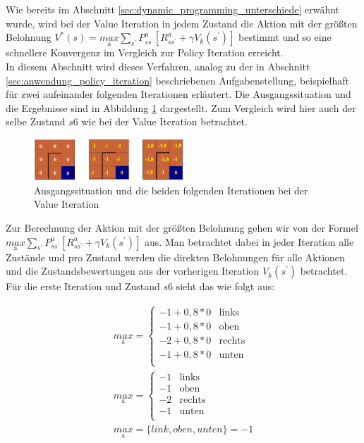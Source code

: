 \documentclass[10pt]{scrartcl}
\begin{document}
Wie bereits im Abschnitt \ref{sec:dynamic_programming_unterschiede} erwähnt wurde, wird bei der Value Iteration in jedem Zustand die Aktion mit der größten Belohnung $V^{*}(s) = \underset{\text{a}}{max} \sum_{s^{'}} P^a_{ss^{'}} [R^a_{ss^{'}} + \gamma V_{k} (s^{'})]$ bestimmt und so eine schnellere Konvergenz im Vergleich zur Policy Iteration erreicht.\\
In diesem Abschnitt wird dieses Verfahren, analog zu der in Abschnitt \ref{sec:anwendung_policy_iteration} beschriebenen Aufgabenstellung, beispielhaft für zwei aufeinander folgenden Iterationen erläutert.
Die Ausgangssituation und die Ergebnisse sind in Abbildung \ref{fig:value_aufgabe} dargestellt.
Zum Vergleich wird hier auch der selbe Zustand $s6$ wie bei der Value Iteration betrachtet.\\ 

\begin{figure}[htbp]
	\centering	\includegraphics[width=0.5\textwidth]{Bilder/ValueIterationAufgabe}
	\caption{Ausgangssituation und die beiden folgenden Iterationen bei der Value Iteration}
	\label{fig:value_aufgabe}
\end{figure}

Zur Berechnung der Aktion mit der größten Belohnung gehen wir von der Formel $\underset{\text{a}}{max} \sum_{s^{'}} P^a_{ss^{'}} [R^a_{ss^{'}} + \gamma V_{k} (s^{'})]$ aus.
Man betrachtet dabei in jeder Iteration alle Zustände und pro Zustand werden die direkten Belohnungen für alle Aktionen und die Zustandsbewertungen aus der vorherigen Iteration $V_{k}(s^{'})$ betrachtet.
Für die erste Iteration und Zustand $s6$ sieht das wie folgt aus:

\begin{align}
	\underset{\text{a}}{max} = \begin{cases} 
		-1 + 0,8 * 0 & \text{links} \\ 
		-1 + 0,8 * 0 & \text{oben} \\
		-2 + 0,8 * 0 & \text{rechts} \\
		-1 + 0,8 * 0 & \text{unten} \\ 
 	\end{cases}\\
 	\underset{\text{a}}{max} = \begin{cases} 
		-1 & \text{links} \\ 
		-1 & \text{oben} \\
		-2 & \text{rechts} \\
		-1 & \text{unten} \\ 
 	\end{cases}\\
 	\underset{\text{a}}{max} = \{ link, oben, unten \} = -1
\end{align}
\end{document}
